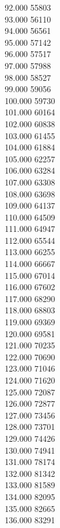 { 92.000	55803 \\
 93.000	56110 \\
 94.000	56561 \\
 95.000	57142 \\
 96.000	57517 \\
 97.000	57988 \\
 98.000	58527 \\
 99.000	59056 \\
 100.000	59730 \\
 101.000	60164 \\
 102.000	60838 \\
 103.000	61455 \\
 104.000	61884 \\
 105.000	62257 \\
 106.000	63284 \\
 107.000	63308 \\
 108.000	63698 \\
 109.000	64137 \\
 110.000	64509 \\
 111.000	64947 \\
 112.000	65544 \\
 113.000	66255 \\
 114.000	66667 \\
 115.000	67014 \\
 116.000	67602 \\
 117.000	68290 \\
 118.000	68803 \\
 119.000	69369 \\
 120.000	69581 \\
 121.000	70235 \\
 122.000	70690 \\
 123.000	71046 \\
 124.000	71620 \\
 125.000	72087 \\
 126.000	72877 \\
 127.000	73456 \\
 128.000	73701 \\
 129.000	74426 \\
 130.000	74941 \\
 131.000	78174 \\
 132.000	81342 \\
 133.000	81589 \\
 134.000	82095 \\
 135.000	82665 \\
 136.000	83291 \\
}
